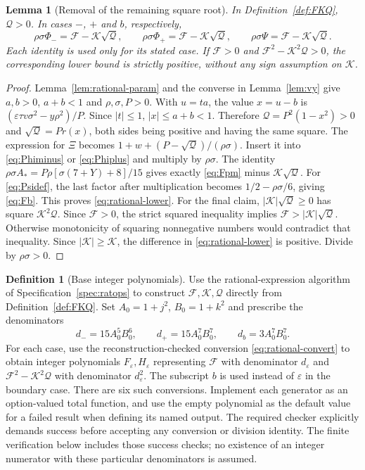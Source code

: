 \documentclass[11pt,a4paper]{article}
\newtheorem{lemma}{Lemma}[section]
\theoremstyle{definition}
\newtheorem{definition}{Definition}[section]
\newcommand{\E}[2]{\refstepcounter{equation}\[#2\tag{\theequation}\label{eq:#1}\]}
\begin{document}
\begin{lemma}[Removal of the remaining square root]\label{lem:remove-root}
In Definition~\ref{def:FKQ}, $\mathcal Q>0$. In cases $-$, $+$ and $b$, respectively,
\E{rational-lower}{\rho\sigma\Phi_-=\mathcal F-\mathcal K\sqrt{\mathcal Q},\qquad
 \rho\sigma\Phi_+=\mathcal F-\mathcal K\sqrt{\mathcal Q},\qquad
 \rho\sigma\Psi=\mathcal F-\mathcal K\sqrt{\mathcal Q}.}
Each identity is used only for its stated case. If $\mathcal F>0$ and $\mathcal F^2-\mathcal K^2\mathcal Q>0$, the corresponding lower bound is strictly positive, without any sign assumption on $\mathcal K$.
\end{lemma}
\begin{proof}
Lemma~\ref{lem:rational-param} and the converse in Lemma~\ref{lem:vy} give $a,b>0$, $a+b<1$ and $\rho,\sigma,P>0$. With $u=ta$, the value $x=u-b$ is $(\varepsilon\tau v\sigma^2-y\rho^2)/P$. Since $|t|\leq1$, $|x|\leq a+b<1$. Therefore $\mathcal Q=P^2(1-x^2)>0$ and $\sqrt{\mathcal Q}=P r(x)$, both sides being positive and having the same square. The expression for $\Xi$ becomes
$1+w+(P-\sqrt{\mathcal Q})/(\rho\sigma)$.
Insert it into \eqref{eq:Phiminus} or \eqref{eq:Phiplus} and multiply by $\rho\sigma$. The identity
$\rho\sigma A_*=P\rho[\sigma(7+Y)+8]/15$ gives exactly \eqref{eq:Fpm} minus $\mathcal K\sqrt{\mathcal Q}$. For \eqref{eq:Psidef}, the last factor after multiplication becomes $1/2-\rho\sigma/6$, giving \eqref{eq:Fb}. This proves \eqref{eq:rational-lower}.
For the final claim, $|\mathcal K|\sqrt{\mathcal Q}\geq0$ has square $\mathcal K^2\mathcal Q$. Since $\mathcal F>0$, the strict squared inequality implies $\mathcal F>|\mathcal K|\sqrt{\mathcal Q}$. Otherwise monotonicity of squaring nonnegative numbers would contradict that inequality. Since $|\mathcal K|\geq\mathcal K$, the difference in \eqref{eq:rational-lower} is positive. Divide by $\rho\sigma>0$.
\end{proof}

\begin{definition}[Base integer polynomials]\label{def:basepoly}
Use the rational-expression algorithm of Specification~\ref{spec:ratops} to construct $\mathcal F,\mathcal K,\mathcal Q$ directly from Definition~\ref{def:FKQ}. Set $A_0=1+j^2$, $B_0=1+k^2$ and prescribe the denominators
\E{denominators}{d_-=15A_0^5B_0^6,\qquad d_+=15A_0^7B_0^7,\qquad
 d_b=3A_0^7B_0^7.}
For each case, use the reconstruction-checked conversion \eqref{eq:rational-convert} to obtain integer polynomials $F_\varepsilon,H_\varepsilon$ representing $\mathcal F$ with denominator $d_\varepsilon$ and $\mathcal F^2-\mathcal K^2\mathcal Q$ with denominator $d_\varepsilon^2$. The subscript $b$ is used instead of $\varepsilon$ in the boundary case.
There are six such conversions. Implement each generator as an option-valued total function, and use the empty polynomial as the default value for a failed result when defining its named output. The required checker explicitly demands success before accepting any conversion or division identity. The finite verification below includes those success checks; no existence of an integer numerator with these particular denominators is assumed.
\end{definition}
\end{document}
